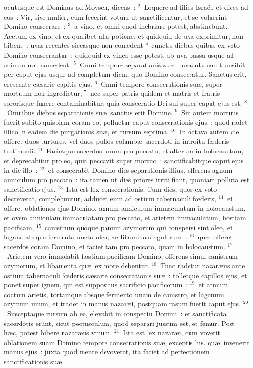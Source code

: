 \bchapter
{}ocutusque est Dominus ad Moysen, dicens~:
${}^{2}$~Loquere ad filios Isra\"el, et dices ad eos~: Vir, sive mulier, cum fecerint votum ut sanctificentur, et se voluerint Domino consecrare~:
${}^{3}$~a vino, et omni quod inebriare potest, abstinebunt. Acetum ex vino, et ex qualibet alia potione, et quidquid de uva exprimitur, non bibent~: uvas recentes siccasque non comedent
${}^{4}$~cunctis diebus quibus ex voto Domino consecrantur~: quidquid ex vinea esse potest, ab uva passa usque ad acinum non comedent.
${}^{5}$~Omni tempore separationis su\ae\ novacula non transibit per caput ejus usque ad completum diem, quo Domino consecratur. Sanctus erit, crescente c\ae sarie capitis ejus.
${}^{6}$~Omni tempore consecrationis su\ae , super mortuum non ingredietur,
${}^{7}$~nec super patris quidem et matris et fratris sororisque funere contaminabitur, quia consecratio Dei sui super caput ejus est.
${}^{8}$~Omnibus diebus separationis su\ae\ sanctus erit Domino.
${}^{9}$~Sin autem mortuus fuerit subito quispiam coram eo, polluetur caput consecrationis ejus~: quod radet illico in eadem die purgationis su\ae , et rursum septima.
${}^{10}$~In octava autem die offeret duos turtures, vel duos pullos columb\ae\ sacerdoti in introitu fœderis testimonii.
${}^{11}$~Facietque sacerdos unum pro peccato, et alterum in holocaustum, et deprecabitur pro eo, quia peccavit super mortuo~: sanctificabitque caput ejus in die illo~:
${}^{12}$~et consecrabit Domino dies separationis illius, offerens agnum anniculum pro peccato~: ita tamen ut dies priores irriti fiant, quoniam polluta est sanctificatio ejus.
${}^{13}$~Ista est lex consecrationis. Cum dies, quos ex voto decreverat, complebuntur, adducet eum ad ostium tabernaculi fœderis,
${}^{14}$~et offeret oblationes ejus Domino, agnum anniculum immaculatum in holocaustum, et ovem anniculam immaculatam pro peccato, et arietem immaculatum, hostiam pacificam,
${}^{15}$~canistrum quoque panum azymorum qui conspersi sint oleo, et lagana absque fermento uncta oleo, ac libamina singulorum~:
${}^{16}$~qu\ae\ offeret sacerdos coram Domino, et faciet tam pro peccato, quam in holocaustum.
${}^{17}$~Arietem vero immolabit hostiam pacificam Domino, offerens simul canistrum azymorum, et libamenta qu\ae\ ex more debentur.
${}^{18}$~Tunc radetur nazar\ae us ante ostium tabernaculi fœderis c\ae sarie consecrationis su\ae~: tolletque capillos ejus, et ponet super ignem, qui est suppositus sacrificio pacificorum~:
${}^{19}$~et armum coctum arietis, tortamque absque fermento unam de canistro, et laganum azymum unum, et tradet in manus nazar\ae i, postquam rasum fuerit caput ejus.
${}^{20}$~Susceptaque rursum ab eo, elevabit in conspectu Domini~: et sanctificata sacerdotis erunt, sicut pectusculum, quod separari jussum est, et femur. Post h\ae c, potest bibere nazar\ae us vinum.
${}^{21}$~Ista est lex nazar\ae i, cum voverit oblationem suam Domino tempore consecrationis su\ae , exceptis his, qu\ae\ invenerit manus ejus~: juxta quod mente devoverat, ita faciet ad perfectionem sanctificationis su\ae .


